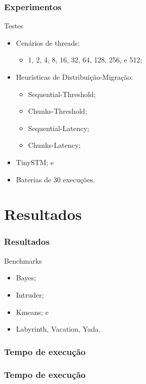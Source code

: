 \documentclass[10pt, pdf,xcolor=pdftex,dvipsnames,table]{beamer}
\begin{document}
\begin{frame} \frametitle{Experimentos}
    \begin{block}{Testes}
        \begin{itemize}
        	\item Cenários de threads: 
            \begin{itemize}
                \item 1, 2, 4, 8, 16, 32, 64, 128, 256, e 512;
            \end{itemize}
            \item Heurísticas de Distribuição-Migração:
            \begin{itemize}
                \item Sequential-Threshold;
                \item Chunks-Threshold;
                \item Sequential-Latency;
                \item Chunks-Latency;
            \end{itemize}
            \item TinySTM; e
            \item Baterias de 30 execuções.
        \end{itemize}
    \end{block}
\end{frame}

\section{Resultados}
\begin{frame} \frametitle{Resultados}
    \begin{block}{Benchmarks}
        \begin{itemize}
        	\item Bayes;
        	\item Intruder;
        	\item Kmeans; e
        	\item Labyrinth, Vacation, Yada.
        \end{itemize}
    \end{block}
\end{frame}

\begin{frame} \frametitle{Tempo de execução}
    
\end{frame}

\begin{frame} \frametitle{Tempo de execução}
    
\end{frame}
\end{document}
